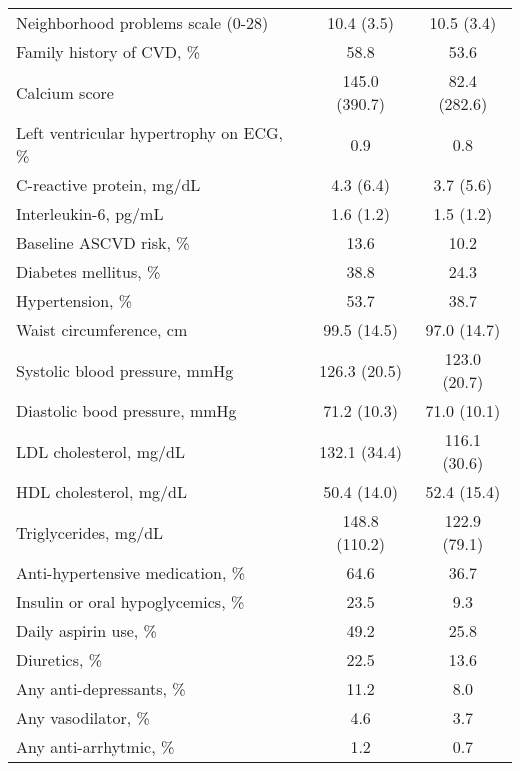 \begin{longtable}{lcc}
Neighborhood problems scale (0-28) & 10.4 (3.5) & 10.5 (3.4) \\ 
Family history of CVD, \% & 58.8 & 53.6 \\ 
Calcium score & 145.0 (390.7) & 82.4 (282.6) \\ 
Left ventricular hypertrophy on ECG, \% & 0.9 & 0.8 \\ 
C-reactive protein, mg/dL & 4.3 (6.4) & 3.7 (5.6) \\ 
Interleukin-6, pg/mL & 1.6 (1.2) & 1.5 (1.2) \\ 
Baseline ASCVD risk, \% & 13.6 & 10.2 \\ 
Diabetes mellitus, \% & 38.8 & 24.3 \\ 
Hypertension, \% & 53.7 & 38.7 \\ 
Waist circumference, cm & 99.5 (14.5) & 97.0 (14.7) \\ 
Systolic blood pressure, mmHg & 126.3 (20.5) & 123.0 (20.7) \\ 
Diastolic bood pressure, mmHg & 71.2 (10.3) & 71.0 (10.1) \\ 
LDL cholesterol, mg/dL & 132.1 (34.4) & 116.1 (30.6) \\ 
HDL cholesterol, mg/dL & 50.4 (14.0) & 52.4 (15.4) \\ 
Triglycerides, mg/dL & 148.8 (110.2) & 122.9 (79.1) \\ 
Anti-hypertensive medication, \% & 64.6 & 36.7 \\ 
Insulin or oral hypoglycemics, \% & 23.5 & 9.3 \\ 
Daily aspirin use, \% & 49.2 & 25.8 \\ 
Diuretics, \% & 22.5 & 13.6 \\ 
Any anti-depressants, \% & 11.2 & 8.0 \\ 
Any vasodilator, \% & 4.6 & 3.7 \\ 
Any anti-arrhytmic, \% & 1.2 & 0.7 \\ 
\bottomrule
\end{longtable}
